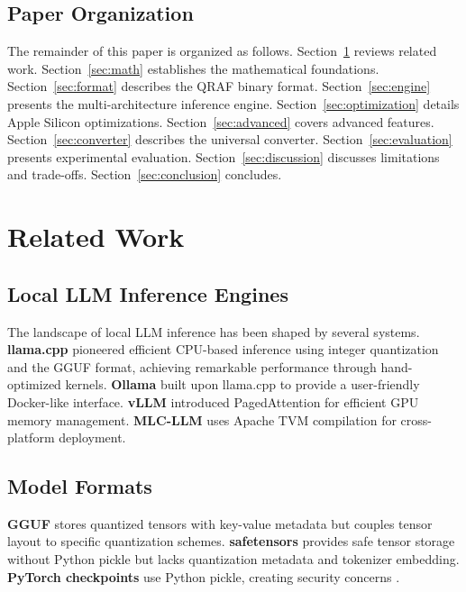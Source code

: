 \documentclass[12pt,a4paper]{article}
\begin{document}
\subsection{Paper Organization}

The remainder of this paper is organized as follows. Section~\ref{sec:related} reviews related work. Section~\ref{sec:math} establishes the mathematical foundations. Section~\ref{sec:format} describes the QRAF binary format. Section~\ref{sec:engine} presents the multi-architecture inference engine. Section~\ref{sec:optimization} details Apple Silicon optimizations. Section~\ref{sec:advanced} covers advanced features. Section~\ref{sec:converter} describes the universal converter. Section~\ref{sec:evaluation} presents experimental evaluation. Section~\ref{sec:discussion} discusses limitations and trade-offs. Section~\ref{sec:conclusion} concludes.

\section{Related Work}
\label{sec:related}

\subsection{Local LLM Inference Engines}

The landscape of local LLM inference has been shaped by several systems. \textbf{llama.cpp} \citep{llamacpp2023} pioneered efficient CPU-based inference using integer quantization and the GGUF format, achieving remarkable performance through hand-optimized kernels. \textbf{Ollama} \citep{ollama2024} built upon llama.cpp to provide a user-friendly Docker-like interface. \textbf{vLLM} \citep{kwon2023vllm} introduced PagedAttention for efficient GPU memory management. \textbf{MLC-LLM} \citep{mlcllm2023} uses Apache TVM compilation for cross-platform deployment.

\subsection{Model Formats}

\textbf{GGUF} \citep{gguf2023} stores quantized tensors with key-value metadata but couples tensor layout to specific quantization schemes. \textbf{safetensors} \citep{safetensors2023} provides safe tensor storage without Python pickle but lacks quantization metadata and tokenizer embedding. \textbf{PyTorch checkpoints} use Python pickle, creating security concerns \citep{pytorch2019}.
\end{document}
